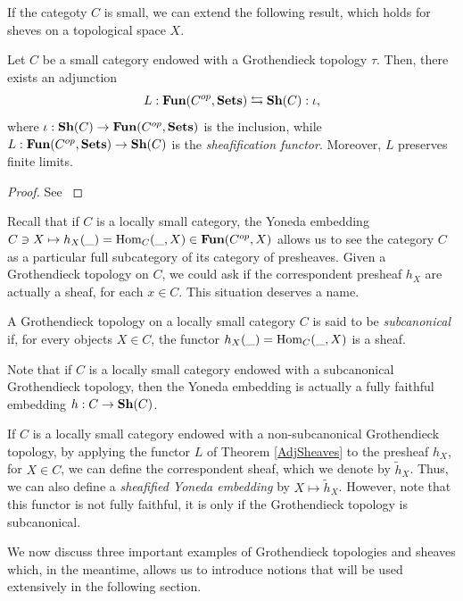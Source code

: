 If the categoty $C$ is small, we can extend the following result, which holds for sheves on a topological space $X$.
\begin{thm}
	Let $C$ be a small category endowed with a Grothendieck topology $\tau$. Then, there exists an adjunction
	\begin{equation}\label{AdjSheaves}
		L:{\normalfont\textbf{Fun}}(C^{op},{\normalfont\textbf{Sets}})\leftrightarrows {\normalfont\textbf{Sh}}(C):\iota,
	\end{equation}
	where $\iota: {\normalfont\textbf{Sh}}(C)\to{\normalfont\textbf{Fun}}(C^{op},{\normalfont\textbf{Sets}})$ is the inclusion, while $L:{\normalfont\textbf{Fun}}(C^{op},{\normalfont\textbf{Sets}})\to{\normalfont\textbf{Sh}}(C)$ is the \textit{sheafification functor}. Moreover, $L$ preserves finite limits.
\end{thm}
\begin{proof}
	See \cite[Par. 3.5]{maclane2012sheaves}
\end{proof}
Recall that if $C$ is a locally small category, the Yoneda embedding $C\ni X\mapsto h_X(\_)=\mbox{Hom}_C(\_,X)\in {\normalfont\textbf{Fun}}(C^{op},X)$ allows us to see the category $C$ as a particular full subcategory of its category of presheaves. Given a Grothendieck topology on $C$, we could ask if the correspondent presheaf $h_X$ are actually a sheaf, for each $x\in C$. This situation deserves a name. 
\begin{defi}
	A Grothendieck topology on a locally small category $C$ is said to be \textit{subcanonical} if, for every objects $X\in C$, the functor $h_X(\_)=\mbox{Hom}_C(\_,X)$ is a sheaf.
\end{defi}
Note that if $C$ is a locally small category endowed with a subcanonical Grothendieck topology, then the Yoneda embedding is actually a fully faithful embedding $h:C\to {\normalfont\textbf{Sh}}(C)$.
\begin{rem}
	If $C$ is a locally small category endowed with a non-subcanonical Grothendieck topology, by applying the functor $L$ of Theorem \ref{AdjSheaves} to the presheaf $h_X$, for $X\in C$, we can define the correspondent sheaf, which we denote by $\tilde{h}_X$. Thus, we can also define a \textit{sheafified Yoneda embedding} by $X\mapsto\tilde{h}_X$. However, note that this functor is not fully faithful, it is only if the Grothendieck topology is subcanonical.
\end{rem}
We now discuss three important examples of Grothendieck topologies and sheaves which, in the meantime, allows us to introduce notions that will be used extensively in the following section.


